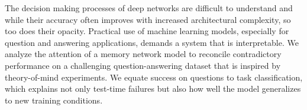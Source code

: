 The decision making processes of deep networks are difficult to understand and while their accuracy often improves with increased architectural complexity, so too does their opacity. Practical use of machine learning models, especially for question and answering applications, demands a system that is interpretable. We analyze the attention of a memory network model to reconcile  contradictory performance on a challenging question-answering dataset that is inspired by theory-of-mind experiments. We equate success on questions to task classification, which explains not only test-time failures but also how well the model generalizes to new training conditions.
